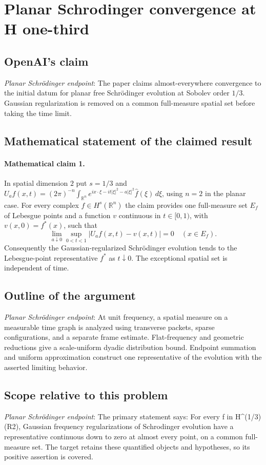 \documentclass[11pt]{article}
\begin{document}
\section*{Planar Schrodinger convergence at H one-third}

\subsection{OpenAI's claim}
\textit{Planar Schrödinger endpoint}: The paper claims almost-everywhere convergence to the initial datum for planar free Schrödinger evolution at Sobolev order $1/3$. Gaussian regularization is removed on a common full-measure spatial set before taking the time limit.

\subsection{Mathematical statement of the claimed result}
\paragraph{Mathematical claim 1.} In spatial dimension $2$ put $s=1/3$ and $U_af(x,t)=(2\pi)^{-n}\int_{\mathbb R^n}e^{ix\cdot\xi-it|\xi|^2-a|\xi|^2}\widehat f(\xi)\,d\xi$, using $n=2$ in the planar case. For every complex $f\in H^s(\mathbb R^n)$ the claim provides one full-measure set $E_f$ of Lebesgue points and a function $v$ continuous in $t\in[0,1)$, with $v(x,0)=f^*(x)$, such that \[\lim_{a\downarrow0}\sup_{0<t<1}|U_af(x,t)-v(x,t)|=0\quad(x\in E_f).\] Consequently the Gaussian-regularized Schr\"odinger evolution tends to the Lebesgue-point representative $f^*$ as $t\downarrow0$. The exceptional spatial set is independent of time.

\subsection{Outline of the argument}
\textit{Planar Schrödinger endpoint}: At unit frequency, a spatial measure on a measurable time graph is analyzed using transverse packets, sparse configurations, and a separate frame estimate. Flat-frequency and geometric reductions give a scale-uniform dyadic distribution bound. Endpoint summation and uniform approximation construct one representative of the evolution with the asserted limiting behavior.

\subsection{Scope relative to this problem}
\textit{Planar Schrödinger endpoint}: The primary statement says: For every f in H\textasciicircum{}(1/3)(R2), Gaussian frequency regularizations of Schrodinger evolution have a representative continuous down to zero at almost every point, on a common full-measure set. The target retains these quantified objects and hypotheses, so its positive assertion is covered.
\end{document}

